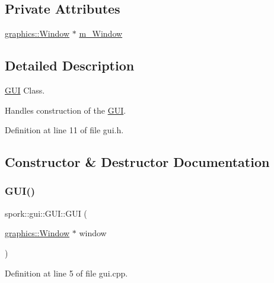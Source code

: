 \subsection*{Private Attributes}
\begin{DoxyCompactItemize}
\item 
\hyperlink{classspork_1_1graphics_1_1_window}{graphics\+::\+Window} $\ast$ \hyperlink{classspork_1_1gui_1_1_g_u_i_ac865a577121a3a5ca2319ef638484956}{m\+\_\+\+Window}
\end{DoxyCompactItemize}


\subsection{Detailed Description}
\hyperlink{classspork_1_1gui_1_1_g_u_i}{G\+UI} Class. 

Handles construction of the \hyperlink{classspork_1_1gui_1_1_g_u_i}{G\+UI}. 

Definition at line 11 of file gui.\+h.



\subsection{Constructor \& Destructor Documentation}
\mbox{\label{classspork_1_1gui_1_1_g_u_i_a28fe6b112dddc8530e2b3df51d3b55b4}} 
\subsubsection{\texorpdfstring{G\+U\+I()}{GUI()}}
{\footnotesize\ttfamily spork\+::gui\+::\+G\+U\+I\+::\+G\+UI (\begin{DoxyParamCaption}\item[{\hyperlink{classspork_1_1graphics_1_1_window}{graphics\+::\+Window} $\ast$}]{window }\end{DoxyParamCaption})}



Definition at line 5 of file gui.\+cpp.

\mbox{\label{classspork_1_1gui_1_1_g_u_i_ab72190104e3a7209b0b59114a0fef862}} 
